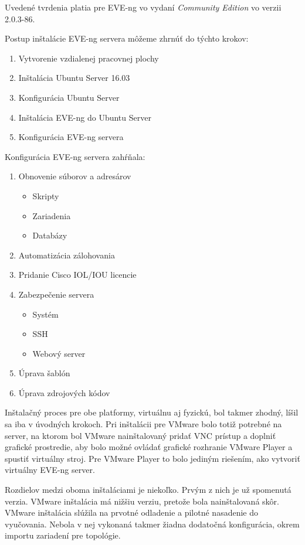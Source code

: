 \noindent
Uvedené tvrdenia platia pre EVE-ng vo vydaní \emph{Community Edition} vo verzii 2.0.3-86.

\noindent
Postup inštalácie EVE-ng servera môžeme zhrnúť do týchto krokov:

\begin{enumerate}
    \item Vytvorenie vzdialenej pracovnej plochy
    \item Inštalácia Ubuntu Server 16.03
    \item Konfigurácia Ubuntu Server
    \item Inštalácia EVE-ng do Ubuntu Server
    \item Konfigurácia EVE-ng servera
\end{enumerate}

\noindent   
Konfigurácia EVE-ng servera zahŕňala:

\begin{enumerate}
    \item Obnovenie súborov a adresárov
    \begin{itemize}
        \item Skripty
        \item Zariadenia
        \item Databázy
    \end{itemize}
    \item Automatizácia zálohovania
    \item Pridanie Cisco IOL/IOU licencie
    \item Zabezpečenie servera
    \begin{itemize}
        \item Systém
        \item SSH
        \item Webový server
    \end{itemize}
    \item Úprava šablón
    \item Úprava zdrojových kódov
\end{enumerate}

Inštalačný proces pre obe platformy, virtuálnu aj fyzickú, bol takmer zhodný, líšil sa iba v úvodných krokoch. Pri inštalácii pre VMware bolo totiž potrebné na server, na ktorom bol VMware nainštalovaný pridať VNC prístup a doplniť grafické prostredie, aby bolo možné ovládať grafické rozhranie VMware Player a spustiť virtuálny stroj. Pre VMware Player to bolo jediným riešením, ako vytvoriť virtuálny EVE-ng server.

Rozdielov medzi oboma inštaláciami je niekoľko. Prvým z nich je už spomenutá verzia. VMware inštalácia má nižšiu verziu, pretože bola nainštalovaná skôr. VMware inštalácia slúžila na prvotné odladenie a pilotné nasadenie do vyučovania. Nebola v nej vykonaná takmer žiadna dodatočná konfigurácia, okrem importu zariadení pre topológie.

